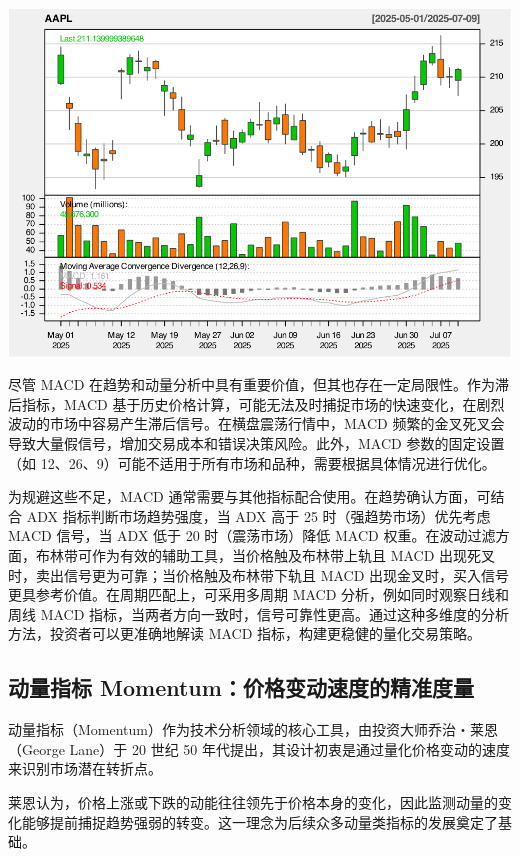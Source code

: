 \documentclass[]{ctexbook}
\begin{document}
\includegraphics[width=0.9\linewidth]{quantmod_files/figure-latex/macd-2}

尽管 MACD 在趋势和动量分析中具有重要价值，但其也存在一定局限性。作为滞后指标，MACD 基于历史价格计算，可能无法及时捕捉市场的快速变化，在剧烈波动的市场中容易产生滞后信号。在横盘震荡行情中，MACD 频繁的金叉死叉会导致大量假信号，增加交易成本和错误决策风险。此外，MACD 参数的固定设置（如 12、26、9）可能不适用于所有市场和品种，需要根据具体情况进行优化。

为规避这些不足，MACD 通常需要与其他指标配合使用。在趋势确认方面，可结合 ADX 指标判断市场趋势强度，当 ADX 高于 25 时（强趋势市场）优先考虑 MACD 信号，当 ADX 低于 20 时（震荡市场）降低 MACD 权重。在波动过滤方面，布林带可作为有效的辅助工具，当价格触及布林带上轨且 MACD 出现死叉时，卖出信号更为可靠；当价格触及布林带下轨且 MACD 出现金叉时，买入信号更具参考价值。在周期匹配上，可采用多周期 MACD 分析，例如同时观察日线和周线 MACD 指标，当两者方向一致时，信号可靠性更高。通过这种多维度的分析方法，投资者可以更准确地解读 MACD 指标，构建更稳健的量化交易策略。

\subsection{动量指标 Momentum：价格变动速度的精准度量}\label{ux52a8ux91cfux6307ux6807-momentumux4ef7ux683cux53d8ux52a8ux901fux5ea6ux7684ux7cbeux51c6ux5ea6ux91cf}

动量指标（Momentum）作为技术分析领域的核心工具，由投资大师乔治・莱恩（George Lane）于 20 世纪 50 年代提出，其设计初衷是通过量化价格变动的速度来识别市场潜在转折点。

莱恩认为，价格上涨或下跌的动能往往领先于价格本身的变化，因此监测动量的变化能够提前捕捉趋势强弱的转变。这一理念为后续众多动量类指标的发展奠定了基础。
\end{document}
